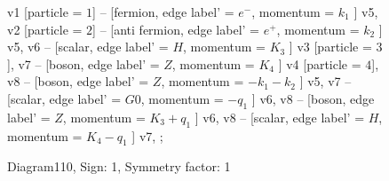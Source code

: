 \documentclass{revtex4}
\begin{document}
\begin{figure}[!htb]
\begin{center}
{    %
v1 [particle = \(1\)] -- [fermion, edge label' = \(e^{-}\), momentum = \(k_{1}\) ] v5, 
v2 [particle = \(2\)] -- [anti fermion, edge label' = \(e^{+}\), momentum = \(k_{2}\) ] v5, 
v6 -- [scalar, edge label' = \(H\), momentum = \(K_{3}\) ] v3 [particle = \(3\)], 
v7 -- [boson, edge label' = \(Z\), momentum = \(K_{4}\) ] v4 [particle = \(4\)], 
v8 -- [boson, edge label' = \(Z\), momentum = \(-k_{1} - k_{2}\) ] v5, 
v7 -- [scalar, edge label' = \(G0\), momentum = \(-q_{1}\) ] v6, 
v8 -- [boson, edge label' = \(Z\), momentum = \(K_{3} + q_{1}\) ] v6, 
v8 -- [scalar, edge label' = \(H\), momentum = \(K_{4} - q_{1}\) ] v7, 
};
\end{center}
\caption{Diagram110, Sign: 1, Symmetry factor: 1}
\end{figure}
\newpage
\end{document}

